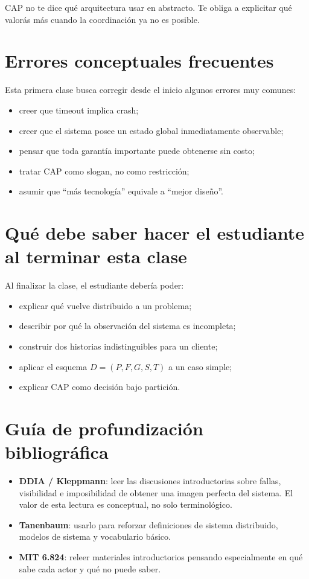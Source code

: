 \documentclass[variant=apuntes,cover=institutional,mode=screen]{ua-engineering-v6-article}
\begin{document}
CAP no te dice qué arquitectura usar en abstracto.
Te obliga a explicitar qué valorás más cuando la coordinación ya no es posible.

\section{Errores conceptuales frecuentes}\label{sec:errores-conceptuales-frecuentes}

Esta primera clase busca corregir desde el inicio algunos errores muy comunes:

\begin{itemize}
\item creer que timeout implica crash;
\item creer que el sistema posee un estado global inmediatamente observable;
\item pensar que toda garantía importante puede obtenerse sin costo;
\item tratar CAP como slogan, no como restricción;
\item asumir que “más tecnología” equivale a “mejor diseño”.
\end{itemize}

\section{Qué debe saber hacer el estudiante al terminar esta clase}\label{sec:que-debe-saber-hacer-el-estudiante-al-terminar-esta-clase}

Al finalizar la clase, el estudiante debería poder:

\begin{itemize}
\item explicar qué vuelve distribuido a un problema;
\item describir por qué la observación del sistema es incompleta;
\item construir dos historias indistinguibles para un cliente;
\item aplicar el esquema $D=(P,F,G,S,T)$ a un caso simple;
\item explicar CAP como decisión bajo partición.
\end{itemize}

\section{Guía de profundización bibliográfica}\label{sec:guia-de-profundizacion-bibliografica}

\begin{itemize}
\item \textbf{DDIA / Kleppmann}: leer las discusiones introductorias sobre fallas, visibilidad e imposibilidad de obtener una imagen perfecta del sistema.
El valor de esta lectura es conceptual, no solo terminológico.
\item \textbf{Tanenbaum}: usarlo para reforzar definiciones de sistema distribuido, modelos de sistema y vocabulario básico.
\item \textbf{MIT 6.824}: releer materiales introductorios pensando especialmente en qué sabe cada actor y qué no puede saber.
\end{itemize}
\end{document}
